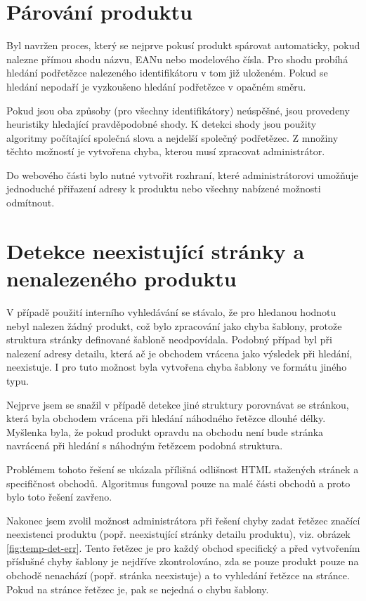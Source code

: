 \documentclass[thesis=B,czech]{FITthesis}[2012/06/26]
\begin{document}
\section{Párování produktu}
Byl navržen proces, který se nejprve pokusí produkt spárovat automaticky, pokud nalezne přímou shodu názvu, EANu nebo modelového čísla.
Pro shodu probíhá hledání podřetězce nalezeného identifikátoru v tom již uloženém. Pokud se hledání nepodaří je vyzkoušeno hledání
podřetězce v opačném směru.
\par
Pokud jsou oba způsoby (pro všechny identifikátory) neúspěšné, jsou provedeny heuristiky hledající pravděpodobné shody. K detekci shody jsou použity algoritmy počítající společná slova a nejdelší společný podřetězec. Z množiny těchto možností je vytvořena chyba, kterou musí zpracovat administrátor.
\par 
Do webového části bylo nutné vytvořit rozhraní, které administrátorovi umožňuje jednoduché přiřazení 
adresy k produktu nebo všechny nabízené možnosti odmítnout.


\section{Detekce neexistující stránky a nenalezeného produktu}
V případě použití interního vyhledávání se stávalo, že pro hledanou hodnotu nebyl nalezen žádný produkt, což bylo zpracování
jako chyba šablony, protože struktura stránky definované šabloně neodpovídala. Podobný případ byl při nalezení adresy detailu, která
ač je obchodem vrácena jako výsledek při hledání, neexistuje. I pro tuto možnost byla vytvořena chyba šablony ve formátu jiného typu.
\par
Nejprve jsem se snažil v případě detekce jiné struktury porovnávat se stránkou, která byla obchodem vrácena při hledání náhodného
řetězce dlouhé délky. Myšlenka byla, že pokud produkt opravdu na obchodu není bude stránka navrácená při hledání s náhodným řetězcem podobná struktura.
\par
Problémem tohoto řešení se ukázala přílišná odlišnost HTML stažených stránek a specifičnost obchodů. Algoritmus fungoval
pouze na malé části obchodů a proto bylo toto řešení zavřeno.
\par
Nakonec jsem zvolil možnost administrátora při řešení chyby zadat řetězec značící neexistenci produktu (popř. neexistující stránky detailu produktu), viz. obrázek \ref{fig:temp-det-err}. Tento řetězec je pro každý obchod specifický a před vytvořením příslušné chyby šablony je nejdříve zkontrolováno, zda
se pouze produkt pouze na obchodě nenachází (popř. stránka neexistuje) a to vyhledání řetězce na stránce. Pokud na stránce řetězec je, pak
se nejedná o chybu šablony.
\end{document}
